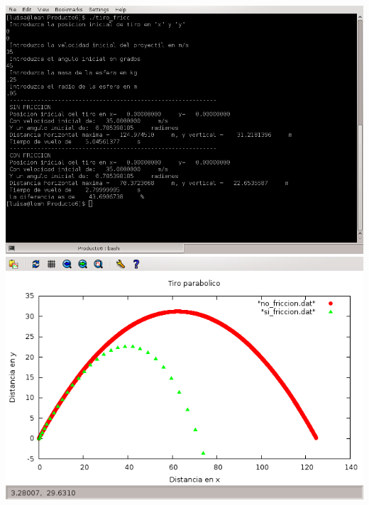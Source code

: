 \documentclass[10pt]{article}
\begin{document}
\includegraphics[scale=0.6]{45grad.png}
\\
\includegraphics[scale=0.6]{45graf.png}
\end{document}
